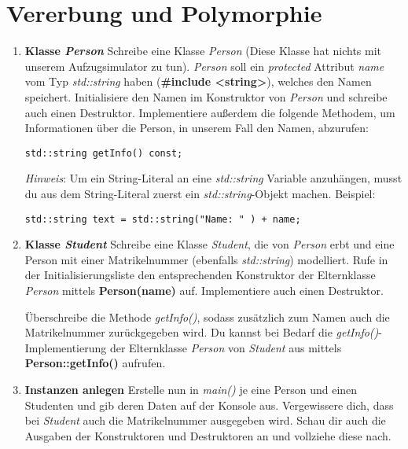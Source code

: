 

\newcommand{\tag}{3}

\cppSetTitle


	
\cppSetHeaderAndMakeTitle  

\vspace{5mm}

\section{Vererbung und Polymorphie}
\begin{enumerate}
\item \textbf{Klasse \emph{Person}}
Schreibe eine Klasse \emph{Person} (Diese Klasse hat nichts mit unserem Aufzugsimulator zu tun).
\emph{Person} soll ein \emph{protected} Attribut \emph{name} vom Typ \emph{std::string} haben (\textbf{\#include <string>}), welches den Namen speichert. 
Initialisiere den Namen im Konstruktor von \emph{Person} und schreibe auch einen Destruktor.
Implementiere außerdem die folgende Methodem, um Informationen über die Person, in unserem Fall den Namen, abzurufen:
\begin{lstlisting}
std::string getInfo() const;
\end{lstlisting}

\emph{Hinweis}: Um ein String-Literal an eine \emph{std::string} Variable anzuhängen, musst du aus dem String-Literal zuerst ein \emph{std::string}-Objekt machen.
Beispiel:
\begin{lstlisting}
std::string text = std::string("Name: " ) + name;
\end{lstlisting}

\item \textbf{Klasse \emph{Student}}
Schreibe eine Klasse \emph{Student}, die von \emph{Person} erbt und eine Person mit einer Matrikelnummer (ebenfalls \emph{std::string}) modelliert.
Rufe in der Initialisierungsliste den entsprechenden Konstruktor der Elternklasse \emph{Person} mittels \textbf{Person(name)} auf.
Implementiere auch einen Destruktor. 

Überschreibe die Methode \emph{getInfo()}, sodass zusätzlich zum Namen auch die Matrikelnummer zurückgegeben wird.
Du kannst bei Bedarf die \emph{getInfo()}-Implementierung der Elternklasse \emph{Person} von \emph{Student} aus mittels \textbf{Person::getInfo()} aufrufen.

\item \textbf{Instanzen anlegen}
Erstelle nun in \emph{main()} je eine Person und einen Studenten und gib deren Daten auf der Konsole aus.
Vergewissere dich, dass bei \emph{Student} auch die Matrikelnummer ausgegeben wird.
Schau dir auch die Ausgaben der Konstruktoren und Destruktoren an und vollziehe diese nach.


\end{enumerate}
